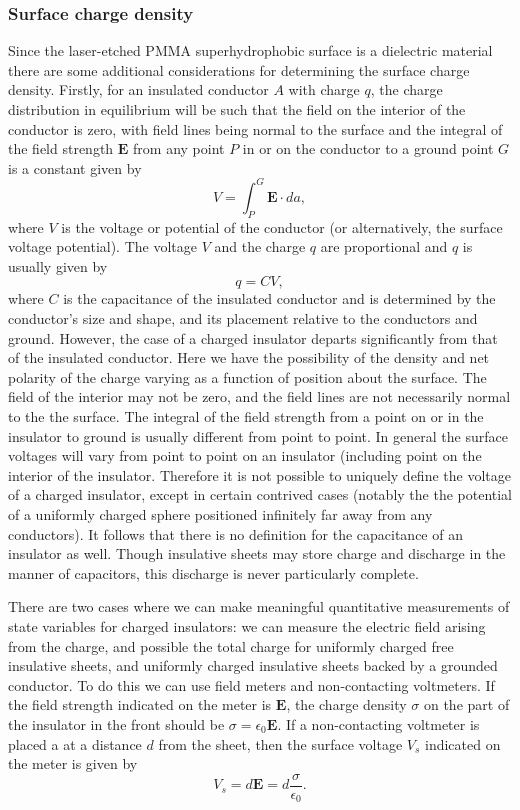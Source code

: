 \documentclass[10pt,a4paper]{article}
\begin{document}
\subsubsection{Surface charge density}
Since the laser-etched PMMA superhydrophobic surface is a dielectric material there are some additional considerations for determining the surface charge density. Firstly, for an insulated conductor $A$ with charge $q$, the charge distribution in equilibrium will be such that the field on the interior of the conductor is zero, with field lines being normal to the surface and the integral of the field strength $\mathbf{E}$ from any point $P$ in or on the conductor to a ground point $G$ is a constant given by
\[ V = \int^G_P \mathbf{E} \cdot da, \]
where $V$ is the voltage or potential of the conductor (or alternatively, the surface voltage potential). The voltage $V$ and the charge $q$ are proportional and $q$ is usually given by
\[q = CV, \]
where $C$ is the capacitance of the insulated conductor and is determined by the conductor's size and shape, and its placement relative to the conductors and ground. However, the case of a charged insulator departs significantly from that of the insulated conductor. Here we have the possibility of the density and net polarity of the charge varying as a function of position about the surface. The field of the interior may not be zero, and the field lines are not necessarily normal to the the surface. The integral of the field strength from a point on or in the insulator to ground is usually different from point to point. In general the surface voltages will vary from point to point on an insulator (including point on the interior of the insulator. Therefore it is not possible to uniquely define the voltage of a charged insulator, except in certain contrived cases (notably the the potential of a uniformly charged sphere positioned infinitely far away from any conductors). It follows that there is no definition for the capacitance of an insulator as well. Though insulative sheets may store charge and discharge in the manner of capacitors, this discharge is never particularly complete.

There are two cases where we can make meaningful quantitative measurements of state variables for charged insulators: we can measure the electric field arising from the charge, and possible the total charge for uniformly charged free insulative sheets, and uniformly charged insulative sheets backed by a grounded conductor. To do this we can use field meters and non-contacting voltmeters. If the field strength indicated on the meter is $\mathbf{E}$, the charge density $\sigma$ on the part of the insulator in the front should be $\sigma = \epsilon_0 \mathbf{E}$. If a non-contacting voltmeter is placed a at a distance $d$ from the sheet, then the surface voltage $V_s$ indicated on the meter is given by 
\[V_s = d \mathbf{E} = d \frac{\sigma}{\epsilon_0}. \]
\end{document}
